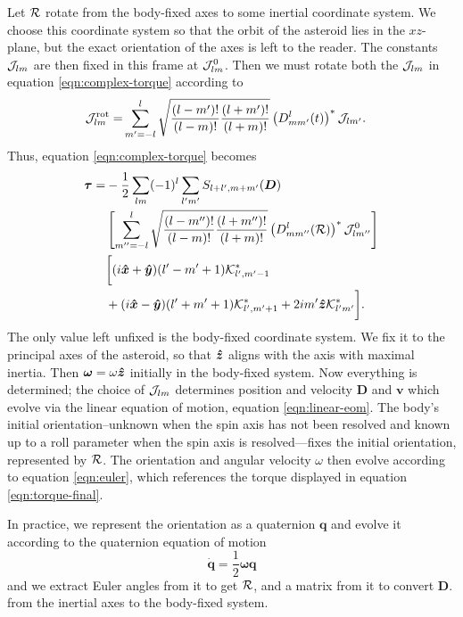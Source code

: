 \documentclass[aps,twocolumn,secnumarabic,balancelastpage,amsmath,amssymb,nofootinbib,floatfix]{revtex4-1}
\begin{document}
Let $\mathcal{R}$ rotate from the body-fixed axes to some inertial coordinate system. We choose this coordinate system so that the orbit of the asteroid lies in the $xz$-plane, but the exact orientation of the axes is left to the reader. The constants $\mathcal{J}_{lm}$ are then fixed in this frame at $\mathcal{J}_{lm}^0$. Then we must rotate both the $\mathcal{J}_{lm}$ in equation \ref{eqn:complex-torque} according to
\begin{equation*}
\begin{aligned}
\mathcal{J}^\text{rot}_{lm} =&\sum_{m'=-l}^l\sqrt{\frac{(l-m')!}{(l-m)!}\frac{(l+m')!}{(l+m)!}}\left( D^l_{mm'}(t) \right)^*\mathcal{J}_{lm'}.
\end{aligned}
\end{equation*}
Thus, equation \ref{eqn:complex-torque} becomes
\begin{equation*}
\begin{aligned}
\bm \tau = &-\frac{1}{2}\sum_{lm}(-1)^l\sum_{l'm'}S_{l+l',m+m'}(\bm D)\\
&\left[ \sum_{m''=-l}^l\sqrt{\frac{(l-m'')!}{(l-m)!}\frac{(l+m'')!}{(l+m)!}}\left( D^l_{mm''}(\mathcal{R}) \right)^*\mathcal{J}_{lm''}^0 \right]\\
&\bigg[(i\bm{\hat x} + \bm{\hat y})(l'-m'+1)\mathcal{K}^*_{l',m'-1}\\
&+(i\bm{\hat x}-\bm{\hat y})(l'+m'+1)\mathcal{K}^*_{l',m'+1}+2im'\bm{\hat z} \mathcal{K}^*_{l'm'}\bigg].
\label{eqn:torque-final}
\end{aligned}
\end{equation*}
The only value left unfixed is the body-fixed coordinate system. We fix it to the principal axes of the asteroid, so that $\bm{\hat z}$ aligns with the axis with maximal inertia. Then $\bm\omega = \omega \bm{\hat z}$ initially in the body-fixed system. Now everything is determined; the choice of $\mathcal{J}_{lm}$ determines position and velocity $\bm D$ and $\bm v$ which evolve via the linear equation of motion, equation \ref{eqn:linear-eom}. The body's initial orientation--unknown when the spin axis has not been resolved and known up to a roll parameter when the spin axis is resolved---fixes the initial orientation, represented by $\mathcal{R}$. The orientation and angular velocity $\omega$ then evolve according to equation \ref{eqn:euler}, which references the torque displayed in equation \ref{eqn:torque-final}.

In practice, we represent the orientation as a quaternion $\bm q$ and evolve it according to the quaternion equation of motion
$$\dot {\bm q} = \frac{1}{2}\bm \omega \bm q$$
and we extract Euler angles from it to get $\mathcal{R}$, and a matrix from it to convert $\bm D$. from the inertial axes to the body-fixed system.
\end{document}
